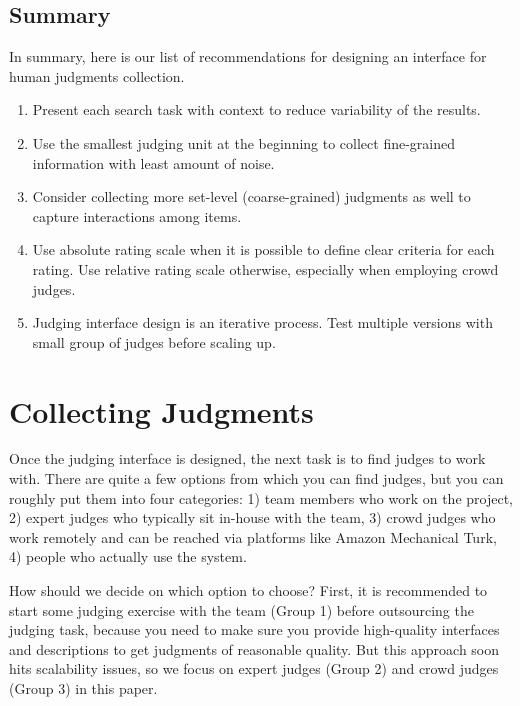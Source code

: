 \subsection{Summary}
In summary, here is our list of recommendations for designing an interface for human judgments collection.

\begin{enumerate}
	\item Present each search task with context to reduce variability of the results.
	\item Use the smallest judging unit at the beginning to collect fine-grained information with least amount of noise. 
	\item Consider collecting more set-level (coarse-grained) judgments as well to capture interactions among items.
	\item Use absolute rating scale when it is possible to define clear criteria for each rating. Use relative rating scale otherwise, especially when employing crowd judges.
	\item Judging interface design is an iterative process. Test multiple versions with small group of judges before scaling up.
\end{enumerate}


\section{Collecting Judgments}

Once the judging interface is designed, the next task is to find judges to work with. There are quite a few options from which you can find judges, but you can roughly put them into four categories: 1) team members who work on the project, 2) expert judges who typically sit in-house with the team, 3) crowd judges who work remotely and can be reached via platforms like Amazon Mechanical Turk, 4) people who actually use the system. %

How should we decide on which option to choose? First, it is recommended to start some judging exercise with the team (Group 1) before outsourcing the judging task, because you need to make sure you provide high-quality interfaces and descriptions to get judgments of reasonable quality. But this approach soon hits scalability issues, so we focus on expert judges (Group 2) and crowd judges (Group 3) in this paper.

